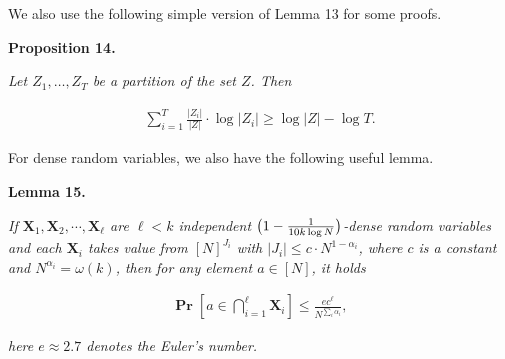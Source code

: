 


We also use the following simple version of Lemma 13 for some proofs.\par





\par\medskip\noindent\textbf{
\textbf{Proposition 14}\textbf{.}
}\par



\emph{Let $Z_{1},\dots,Z_{T}$ be a partition of the set $Z$.
Then}\par


\[\begin{gathered}
\sum_{i=1}^{T}\frac{\left|Z_{i}\right|}{\left|Z\right|}\cdot\log\left|Z_{i}\right|\geq\log\left|Z\right|-\log T.
\end{gathered}\]






For dense random variables, we also have the following useful lemma.\par





\par\medskip\noindent\textbf{
\textbf{Lemma 15}\textbf{.}
}\par



\emph{If $\bm{X}_{1},\bm{X}_{2},\cdots,\bm{X}_{\ell}$ are $\ell<k$ independent $\big{(}1-\frac{1}{10k\log N}\big{)}$-dense random variables and each $\bm{X}_{i}$ takes value from $[N]^{J_{i}}$ with $|J_{i}|\leq c\cdot N^{1-\alpha_{i}}$, where $c$ is a constant and $N^{\alpha_{i}}=\omega(k)$, then for any element $a\in[N]$, it holds}\par


\[\begin{gathered}
\operatorname*{\mathbf{Pr}}\left[a\in\bigcap_{i=1}^{\ell}\bm{X}_{i}\right]\leq\frac{ec^{\ell}}{N^{\sum_{i}\alpha_{i}}},
\end{gathered}\]


\emph{here $e\approx 2.7$ denotes the Euler’s number.}\par







